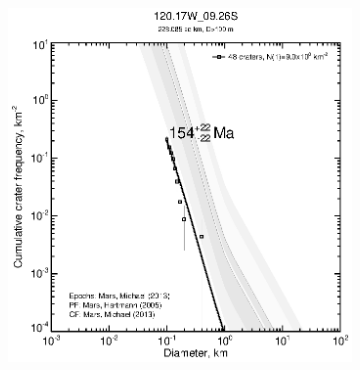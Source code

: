 \documentclass[12pt,letter]{article}
\begin{document}
\begin{figure}[h]
\begin{subfigure}{.33\textwidth}
\end{subfigure}
\begin{subfigure}{.33\textwidth}
  \includegraphics[width=\linewidth,clip,trim=1cm 1cm 1.5cm 1cm]{figures/craterstats/120-17W_09-26S_100m_cum.eps}
\end{subfigure}
\end{figure}
\end{document}
